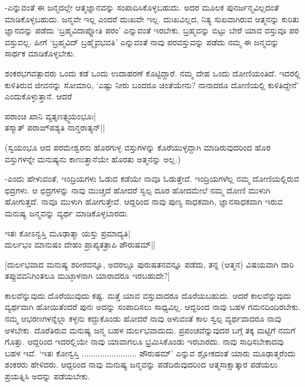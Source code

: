 -ಎನ್ನುವಂತೆ ಈ ಜನ್ಮದಲ್ಲೇ ಆತ್ಮಜ್ಞಾನವನ್ನು ಸಂಪಾದಿಸಿಕೊಳ್ಳಬಹುದು. ಅದರ ಮೂಲಕ ಪುನರ್ಜನ್ಮವಿಲ್ಲದಂತೆ ಮಾಡಿಕೊಳ್ಳಬಹುದು. ಜನ್ಮವೇ ಇಲ್ಲ ಎಂದರೆ ದುಃಖವೇ ಇಲ್ಲ. ದುಃಖವಿಲ್ಲದ, ನಿತ್ಯ ಸುಖವಾಗಿರುವ ಆತ್ಮನನ್ನು ಕುರಿತು ಜ್ಞಾನವನ್ನು ಪಡೆದು `ಬ್ರಹ್ಮವಿದಾಪ್ನೋತಿ ಪರಂ' ಎನ್ನುವಂತೆ ಇರಬೇಕು. ಬ್ರಹ್ಮವನ್ನು ಬಿಟ್ಟು ಬೇರೆ ಯಾವ ವಸ್ತುವೂ ಪರ ವಸ್ತುವಲ್ಲ. ಹೀಗೆ `ಬ್ರಹ್ಮವಿದ್ ಬ್ರಹ್ಮೈವಭವತಿ' ಎನ್ನುವಂತೆ ನಾವು ಪರವಸ್ತುವನ್ನು ಪಡೆದು ನಮ್ಮ ಈ ಜನ್ಮವನ್ನು ಸಾರ್ಥಕ ಮಾಡಿಕೊಳ್ಳಬೇಕು.

ಶಂಕರಭಗವತ್ಪಾದರು ಒಂದು ಕಡೆ ಒಂದು ಉದಾಹರಣೆ ಕೊಟ್ಟಿದ್ದಾರೆ. ನಮ್ಮ ದೇಹ ಒಂದು ದೋಣಿಯಂತಿದೆ. ಇದರಲ್ಲಿ ಕುಳಿತಿರುವ ಜೀವನನ್ನು ಸೋಮಾರಿ, `ಎಷ್ಟು ನೀರು ಬಂದರೂ ಚಿಂತೆಯೇನು? ನಾನಾದರೂ ದೋಣಿಯಲ್ಲಿ ಕುಳಿತಿದ್ದೇನೆ' ಎಂದುಕೊಳ್ಳುತ್ತಾನೆ. ಆದರೆ

\begin{shloka}
ಪರಾಂಚಿ ಖಾನಿ ವ್ಯತೃಣತ್ಸ್ವಯಂಭೂಃ|\\
ತಸ್ಮಾತ್ ಪರಾಙ್‌ಪಶ್ಯತಿ ನಾನ್ತರಾತ್ಯನ್||
\end{shloka}

(ಸ್ವಯಂಭೂ ಆದ ಪರಮೇಶ್ವರನು ಹೊರಗುಳ್ಳ ವಸ್ತುಗಳನ್ನು ಕೊರೆಯುಳ್ಳದ್ದಾಗಿ ಮಾಡಿರುವುದರಿಂದ ಹೊರ ವಸ್ತುಗಳನ್ನೇ ಮನುಷ್ಯನು ಕಾಣುತ್ತಾನೆಯೇ ಹೊರತು ಅತ್ಮನನ್ನು ಅಲ್ಲ.)

-ಎಂದು ಹೇಳುವಂತೆ, ಇಂದ್ರಿಯಗಳು ಓಡುವ ಕಡೆಯೇ ನಾವೂ ಓಡುತ್ತೇವೆ. ಇಂದ್ರಿಯಗಳೆಲ್ಲ ನಮ್ಮ ದೋಣಿಯಲ್ಲಿರುವ ಛಿದ್ರಗಳು. ಆ ಛಿದ್ರಗಳನ್ನು ನಾವು ಮುಚ್ಚದೆ ಹೋದರೆ ಸ್ವಲ್ಪ ದೂರ ಹೋದಮೇಲೆ ನಮ್ಮ ದೋಣಿ ಮುಳುಗಿ ಹೋಗುತ್ತದೆ. ನಾವೂ ಮುಳುಗಿ ಹೋಗುತ್ತೇವೆ. ಆದ್ದರಿಂದ ನಾವು ಪುಣ್ಯ ಸಾಧಕವಾಗಿ, ಜ್ಞಾನಸಾಧಕವಾಗಿ ಇರುವ ಮನುಷ್ಯ ಜನ್ಮವನ್ನು ವ್ಯರ್ಥ ಮಾಡಿಕೊಳ್ಳಬಾರದು.

\begin{shloka}
ಇತಃ ಕೋಽನ್ವಸ್ತಿ ಮೂಢಾತ್ಮಾ ಯಸ್ತು ಪ್ರಮಾದ್ಯತಿ|\\
ದುರ್ಲಭಂ ಮಾನುಷಂ ದೇಹಂ ಪ್ರಾಪ್ಯತತ್ರಾಪಿ ಪೌರುಷಮ್||
\end{shloka}

[ದುರ್ಲಭವಾದ ಮನುಷ್ಯ ಶರೀರವನ್ನೂ, ಅದರಲ್ಲೂ ಪುರುಷತನವನ್ನೂ ಪಡೆದು, ತನ್ನ (ಆತ್ಮನ) ವಿಷಯವಾಗಿ ದಾರಿ ತಪ್ಪುವವನಿಗಿಂತಲೂ ಮುಟ್ಠಾಳನಾಗಿ ಯಾರಾದರೂ ಇರಬಹುದೇ?]

ಕಾಲವೆನ್ನುವುದು ದೊರೆಯುವುದು ಕಷ್ಟ. ಮತ್ತೆ ಯಾವ ವಸ್ತುವಾದರೂ ದೊರೆಯಬಹುದು. ಆದರೆ ಕಾಲವೆನ್ನುವುದು ವ್ಯರ್ಥವಾಗಿ ಹೋಯಿತೆಂದರೆ ಪುನಃ ಅದನ್ನು ಸಂಪಾದಿಸಲು ಸಾಧ್ಯವಿಲ್ಲ. ಆದ್ದರಿಂದ ನಾವು ಬಹಳ ಗಮನದಿಂದಿರಬೇಕು. ನಮ್ಮ ಆಭರಣಗಳನ್ನೆಲ್ಲಾ ಕಳ್ಳನು ಕದ್ದುಕೊಂಡು ಹೋದರೆ ನಾವು ಅಳುವಂತೆ ಕಾಲ ಸ್ವಲ್ಪ ವ್ಯರ್ಥವಾದರೂ ನಾವು ಅಳಬೇಕು. ದೊರೆತಿರುವ ಮನುಷ್ಯ ಜನ್ಮ ಬಹಳ ದುರ್ಲಭವಾದುದು. ಪ್ರಪಂಚವೆನ್ನುವುದರ ಬಗ್ಗೆ ತಕ್ಕ ಮಟ್ಟಿಗೆ ನಮಗೆ ಗೊತ್ತು. ಆದ್ದರಿಂದ ಇದರಲ್ಲಿಯೇ ನಾವು ಯಾವಾಗಲೂ ಭ್ರಮಿಸಿಕೊಂಡು ಇರಬಾರದು. ನಾವು ಸಾಧಿಸಬೇಕಾದವು ಬಹಳ ಇವೆ. `ಇತಃ ಕೋನ್ವಸ್ತಿ ........................ ಪೌರುಷಮ್' ಎನ್ನುವ ಶ್ಲೋಕದಂತೆ ಯಾರು ಮೂಢಾತ್ಮರೆಂದು ಶಂಕರರು ಹೇಳಿದರು. ಆದ್ದರಿಂದ ನಾವು ಮನುಷ್ಯ ಜನ್ಮವನ್ನು ಪಡೆದಿರುವುದರಿಂದ ಆತ್ಮಸಾಕ್ಷಾತ್ಕಾರ ಪಡೆಯಲು ಪ್ರಯತ್ನಿಸಿ ಅದನ್ನು ಪಡೆಯಬೇಕು. 

